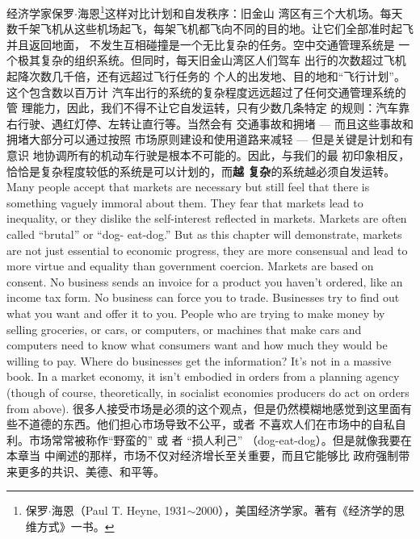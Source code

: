 \begin{paracol}{2}
\switchcolumn
经济学家保罗$\cdot$海恩\footnote{保罗$\cdot$海恩（Paul T. Heyne, 1931$\sim$2000），美国经济学家。著有《经济学的思维方式》一书。}这样对比计划和自发秩序：旧金山
湾区有三个大机场。每天数千架飞机从这些机场起飞，每架飞机都飞向不同的目的地。让它们全部准时起飞并且返回地面，
不发生互相碰撞是一个无比复杂的任务。空中交通管理系统是
一个极其复杂的组织系统。但同时，每天旧金山湾区人们驾车
出行的次数超过飞机起降次数几千倍，还有远超过飞行任务的
个人的出发地、目的地和“飞行计划”。这个包含数以百万计
汽车出行的系统的复杂程度远远超过了任何交通管理系统的管
理能力，因此，我们不得不让它自发运转，只有少数几条特定
的规则：汽车靠右行驶、遇红灯停、左转让直行等。当然会有
交通事故和拥堵 --- 而且这些事故和拥堵大部分可以通过按照
市场原则建设和使用道路来减轻 --- 但是关键是计划和有意识
地协调所有的机动车行驶是根本不可能的。因此，与我们的最
初印象相反，恰恰是复杂程度较低的系统是可以计划的，而\textbf{越
复杂}的系统越必须自发运转。
\switchcolumn*
Many people accept that markets are necessary but still feel
that there is something vaguely immoral about them. They fear
that markets lead to inequality, or they dislike the self-interest
reflected in markets. Markets are often called ``brutal'' or ``dog-
eat-dog.'' But as this chapter will demonstrate, markets are not
just essential to economic progress, they are more consensual
and lead to more virtue and equality than government coercion. Markets are based on consent. No business sends an invoice for
a product you haven't ordered, like an income tax form. No
business can force you to trade. Businesses try to find out what
you want and offer it to you. People who are trying to make
money by selling groceries, or cars, or computers, or machines
that make cars and computers need to know what consumers
want and how much they would be willing to pay. Where do
businesses get the information? It's not in a massive book. In a
market economy, it isn't embodied in orders from a planning
agency (though of course, theoretically, in socialist economies
producers do act on orders from above).
\switchcolumn
很多人接受市场是必须的这个观点，但是仍然模糊地感觉到这里面有些不道德的东西。他们担心市场导致不公平，或者
不喜欢人们在市场中的自私自利。市场常常被称作“野蛮的”
或 者 “损人利己” （dog-eat-dog）。但是就像我要在本章当
中阐述的那样，市场不仅对经济增长至关重要，而且它能够比
政府强制带来更多的共识、美德、和平等。


\end{paracol}
